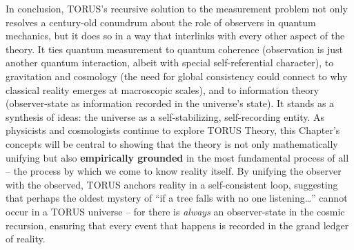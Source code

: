 \documentclass[]{article}
\begin{document}
In conclusion, TORUS's recursive solution to the measurement problem not
only resolves a century-old conundrum about the role of observers in
quantum mechanics, but it does so in a way that interlinks with every
other aspect of the theory. It ties quantum measurement to quantum
coherence (observation is just another quantum interaction, albeit with
special self-referential character), to gravitation and cosmology (the
need for global consistency could connect to why classical reality
emerges at macroscopic scales), and to information theory
(observer-state as information recorded in the universe's state). It
stands as a synthesis of ideas: the universe as a self-stabilizing,
self-recording entity. As physicists and cosmologists continue to
explore TORUS Theory, this Chapter's concepts will be central to showing
that the theory is not only mathematically unifying but also
\textbf{empirically grounded} in the most fundamental process of all --
the process by which we come to know reality itself. By unifying the
observer with the observed, TORUS anchors reality in a self-consistent
loop, suggesting that perhaps the oldest mystery of ``if a tree falls
with no one listening\ldots{}'' cannot occur in a TORUS universe -- for
there is \emph{always} an observer-state in the cosmic recursion,
ensuring that every event that happens is recorded in the grand ledger
of reality.
\end{document}
